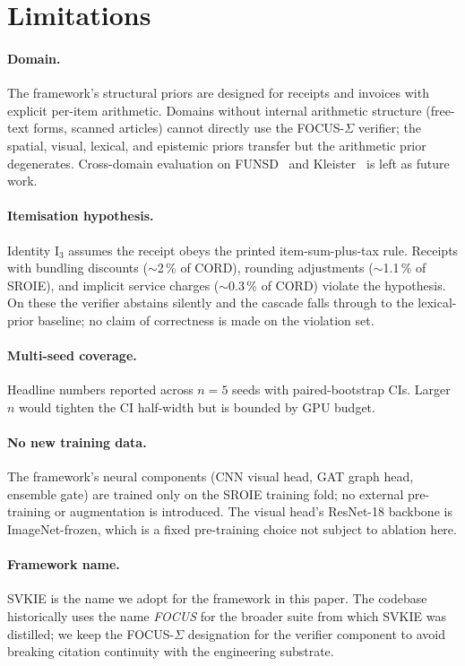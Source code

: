 \section{Limitations}
\label{sec:limitations}

\paragraph{Domain.}  The framework's structural priors are designed
for receipts and invoices with explicit per-item arithmetic.  Domains
without internal arithmetic structure (free-text forms, scanned
articles) cannot directly use the FOCUS-$\Sigma$ verifier; the spatial,
visual, lexical, and epistemic priors transfer but the arithmetic
prior degenerates.  Cross-domain evaluation on FUNSD~\cite{jaume2019funsd}
and Kleister~\cite{stanislawek2021kleister} is left as future work.

\paragraph{Itemisation hypothesis.}  Identity $\mathrm{I}_3$ assumes
the receipt obeys the printed item-sum-plus-tax rule.  Receipts with
bundling discounts ($\sim$2\,\% of CORD), rounding adjustments
($\sim$1.1\,\% of SROIE), and implicit service charges ($\sim$0.3\,\%
of CORD) violate the hypothesis.  On these the verifier abstains
silently and the cascade falls through to the lexical-prior baseline;
no claim of correctness is made on the violation set.

\paragraph{Multi-seed coverage.}  Headline numbers reported across
$n=5$ seeds with paired-bootstrap CIs.  Larger $n$ would tighten
the CI half-width but is bounded by GPU budget.

\paragraph{No new training data.}  The framework's neural components
(CNN visual head, GAT graph head, ensemble gate) are trained only on
the SROIE training fold; no external pre-training or augmentation is
introduced.  The visual head's ResNet-18 backbone is ImageNet-frozen,
which is a fixed pre-training choice not subject to ablation here.

\paragraph{Framework name.}  SVKIE is the name we adopt for the
framework in this paper.  The codebase historically uses the name
\emph{FOCUS} for the broader suite from which SVKIE was distilled;
we keep the FOCUS-$\Sigma$ designation for the verifier component to
avoid breaking citation continuity with the engineering substrate.

